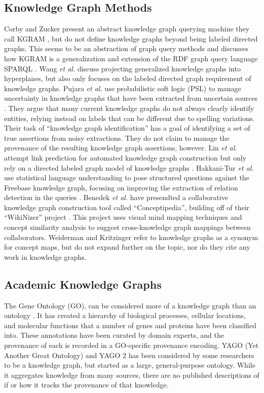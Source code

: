 \subsection{Knowledge Graph Methods}
Corby and Zucker present an abstract knowledge graph querying machine they call KGRAM \cite{Corby_2010}, but do not define knowledge graphs beyond being labeled directed graphs.
This seems to be an abstraction of graph query methods and discusses how KGRAM is a generalization and extension of the RDF graph query language SPARQL \cite{harris2013sparql}.
Wang \emph{et al.} \cite{Wang_knowledgegraph} discuss projecting generalized knowledge graphs into hyperplanes, but also only focuses on the labeled directed graph requirement of knowledge graphs.
Pujara \emph{et al.} use probabilistic soft logic (PSL) to manage uncertainty in knowledge graphs that have been extracted from uncertain sources \cite{Pujara_2013}. 
They argue that many current knowledge graphs do not always clearly identify entities, relying instead on labels that can be different due to spelling variations.
Their task of ``knowledge graph identification'' has a goal of identifying a set of true assertions from noisy extractions.
They do not claim to manage the provenance of the resulting knowledge graph assertions, however.
Lin \emph{et al.} attempt link prediction for automated knowledge graph construction but only rely on a directed labeled graph model of knowledge graphs \cite{lin2015learning}.
Hakkani-Tur \emph{et al.} use statistical language understanding to pose structured questions against the Freebase knowledge graph, focusing on improving the extraction of relation detection in the queries \cite{Hakkani_Tur_2013}.
Benedek \emph{et al.} have presendted a collaborative knowledge graph construction tool called  ``Conceptipedia'', building off of their ``WikiNizer'' project .
This project uses visual mind mapping techniques and concept similarity analysis to suggest cross-knowledge graph mappings between collaborators.
Weiderman and Kritzinger \cite{} refer to knowledge graphs as a synonym for concept maps, but do not expand further on the topic, nor do they cite any work in knowledge graphs.
 

\subsection{Academic Knowledge Graphs}
The Gene Ontology (GO), can be considered more of a knowledge graph than an ontology \cite{Ashburner_2000}.
It has created a hierarchy of biological processes, cellular locations, and molecular functions that a number of genes and proteins have been classified into.
These annotations have been curated by domain experts, and the provenance of each is recorded in a GO-specific provenance encoding.
YAGO (Yet Another Great Ontology) \cite{Suchanek_2007} and YAGO 2 \cite{Hoffart_2013} has been considered by some researchers to be a knowledge graph, but started as a large, general-purpose ontology.
While it aggregates knowledge from many sources, there are no published descriptions of if or how it tracks the provenance of that knowledge.

